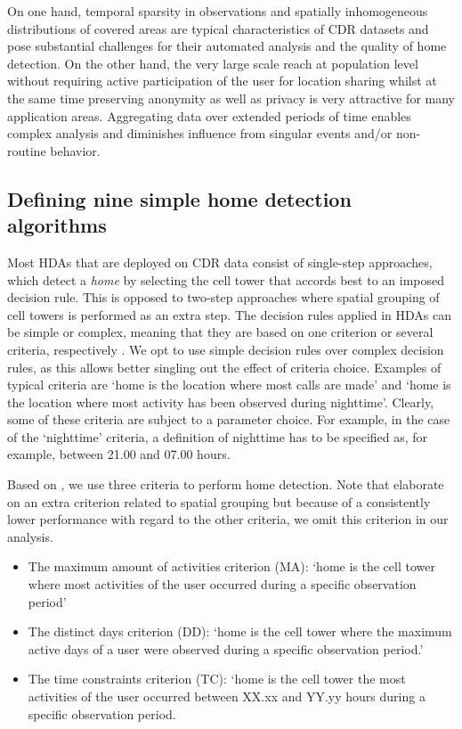 \documentclass[a4paper]{article}
\begin{document}
On one hand, temporal sparsity in observations and spatially inhomogeneous distributions of covered areas are typical characteristics of CDR datasets and pose substantial challenges for their automated analysis and the quality of home detection. On the other hand, the very large scale reach at population level without requiring active participation of the user for location sharing whilst at the same time preserving anonymity as well as privacy is very attractive for many application areas. Aggregating data over extended periods of time enables complex analysis and diminishes influence from singular events and/or non-routine behavior.


\subsection{Defining nine simple home detection algorithms}

Most HDAs that are deployed on CDR data consist of single-step approaches, which detect a \textit{home} by selecting the cell tower that accords best to an imposed decision rule. This is opposed to two-step approaches where spatial grouping of cell towers is performed as an extra step. The decision rules applied in HDAs can be simple or complex, meaning that they are based on one criterion or several criteria, respectively \cite{Vanhoof_JOS}. We opt to use simple decision rules over complex decision rules, as this allows better singling out the effect of criteria choice. Examples of typical criteria are ‘home is the location where most calls are made’ and ‘home is the location where most activity has been observed during nighttime’. Clearly, some of these criteria are subject to a parameter choice. For example, in the case of the ‘nighttime’ criteria, a definition of nighttime has to be specified as, for example, between 21.00 and 07.00 hours.  

Based on \cite{Vanhoof_JOS,Vanhoof_homdet_arxiv, Bojic2015}, we use three criteria to perform home detection. Note that \cite{Vanhoof_JOS} elaborate on an extra criterion related to spatial grouping but because of a consistently lower performance with regard to the other criteria, we omit this criterion in our analysis. 

\begin{itemize}
\item The maximum amount of activities criterion (MA): ‘home is the cell tower where most activities of the user occurred during a specific observation period’
\item The distinct days criterion (DD): ‘home is the cell tower where the maximum active days of a user were observed during a specific observation period.’
\item The time constraints criterion (TC): ‘home is the cell tower the most activities of the user occurred between XX.xx and YY.yy hours during a specific observation period. 
\end{itemize}
\end{document}
